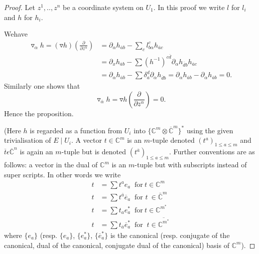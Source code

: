 \begin{proof}
  Let $ {z^1,..,z^n}$ be a coordinate system on ${U_1}$. In this proof
  we write $l$ for $l_i$ and $h$ for ${h_i}$. 
  
  We\pageoriginale have 
  \begin{align*}
    \triangledown_{\alpha} h = ( \triangledown h )
    \left(\frac{\partial}{\partial z^{\alpha}} \right)   
     & = \partial_{\alpha}h_{ \overline{a}b}- \underset{c}{\sum}
     l^c _{b \alpha} h_{\overline{a}c}\\ 
     & = \partial_x h_{\overline{a}b}  -\sum
     (h^{-1})^{c\overline{d}}\partial_\alpha  h_{\overline{d}b}
     h_{\overline{a}c} \\   
     & = \partial_\alpha h_{\overline{a}b} -\sum \delta^d_a
     \partial_\alpha h_{\overline{d}b} = \partial_\alpha
     h_{\overline{a}b} -\partial_\alpha h_{\overline{a}b} =0. 
  \end{align*}
  Similarly one shows that
  $$ 
  \triangledown_{ \overline{\alpha}} h= \triangledown h
  (\frac{\partial}{\partial {\overline{z}}^\alpha})=0.  
  $$
  Hence the proposition.

  (Here $h$ is regarded as a function from $U_i$ into $\bigg\{ \mathbb{C}^m
  \otimes {\overline{\mathbb{C}}}^{m} \bigg \}^{*} $ using the given 
  trivialisation of $E \mid U_i$. A vector $t \in \mathbb{C}^m$ is an $m$-tuple
  denoted $(t^a)_{1 \leq a \leq m}$ and $\overline{t} \epsilon
  {\overline{\mathbb{C}}}^{n}$ is again an $m$-tuple but is denoted 
$(t^{\overline{a}})_{1 \leq a \leq m}$. Further conventions are as
  follows: a vector in the dual of  $\mathbb{C}^{m}$ is an $m$-tuple but with
  subscripts instead of super scripts. In other words we write  
  \begin{align*}
    t & = \sum t^{a} e_{a} ~\text{ for} ~t \in \mathbb{C}^{m}\\
    t &=  \sum t^{\overline{a}} \overline{e}_{a} ~\text{ for } t~ \in
    \bar{\mathbb{C}}^{m}\\ 
    t & = \sum t_{a} e^{*}_{a} ~\text{ for}~ t \in \mathbb{C}^{m^{*}}\\
    t &= \sum t_{\overline{a}}\overline{e}^{*}_{a} ~\text{ for } ~t
    \in {\overline{\mathbb{C}^{m^*}}} 
   \end{align*}
  where $ \{e_{a}\}$ (resp. $\{e_{a}\}$, $\{e^{*}_{a}\}$,
  $\{\overline{e}^{*}_{a}\}$ is the canonical (resp. conjugate of the
  canonical, dual of the canonical, conjugate dual of the canonical)
  basis of   $\mathbb{C}^{m}$).   
\end{proof}

